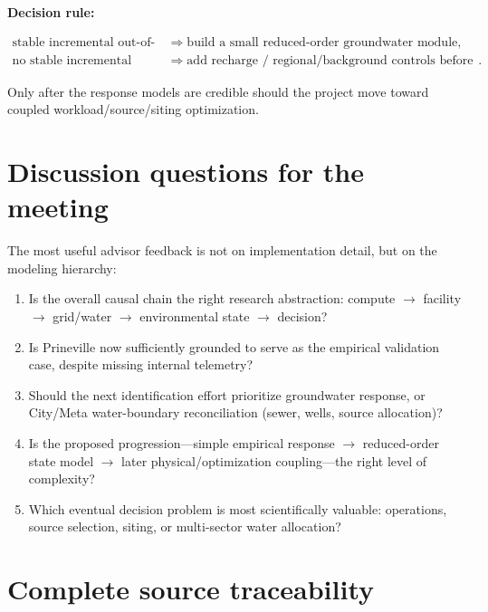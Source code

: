 \documentclass[11pt]{article}
\begin{document}
\textbf{Decision rule:}

\[
\boxed{
\begin{array}{ll}
\text{stable incremental out-of-sample skill} & \Rightarrow \text{build a small reduced-order groundwater module},\\[3pt]
\text{no stable incremental skill} & \Rightarrow \text{add recharge / regional/background controls before model complexity}.
\end{array}}
\]

Only after the response models are credible should the project move toward coupled workload/source/siting optimization.

\section{Discussion questions for the meeting}

The most useful advisor feedback is not on implementation detail, but on the modeling hierarchy:

\begin{enumerate}
\item Is the overall causal chain the right research abstraction: compute \(\rightarrow\) facility \(\rightarrow\) grid/water \(\rightarrow\) environmental state \(\rightarrow\) decision?
\item Is Prineville now sufficiently grounded to serve as the empirical validation case, despite missing internal telemetry?
\item Should the next identification effort prioritize groundwater response, or City/Meta water-boundary reconciliation (sewer, wells, source allocation)?
\item Is the proposed progression---simple empirical response \(\rightarrow\) reduced-order state model \(\rightarrow\) later physical/optimization coupling---the right level of complexity?
\item Which eventual decision problem is most scientifically valuable: operations, source selection, siting, or multi-sector water allocation?
\end{enumerate}

\appendix
\section{Complete source traceability}
\label{app:sources}
\end{document}
